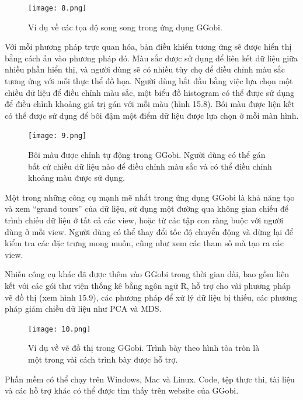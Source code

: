 \documentclass[13pt]{scrartcl} %
\begin{document}
\begin{figure}[!ht] %
    \centering
    \texttt{[image: 8.png]}
    \caption{Ví dụ về các tọa độ song song trong ứng dụng GGobi.}
\end{figure}

Với mỗi phương pháp trực quan hóa, bản điều khiển tương ứng sẽ được hiển thị bằng cách ấn vào phương pháp đó. Màu sắc được sử dụng để liên kết dữ liệu giữa nhiều phần hiển thị, và người dùng sẽ có nhiều tùy chọ để điều chỉnh màu sắc tương ứng với mỗi thực thể đồ họa. Người dùng bắt đầu bằng việc lựa chọn một chiều dữ liệu để điều chỉnh màu sắc, một biểu đồ histogram có thể được sử dụng để điều chỉnh khoảng giá trị gán với mỗi màu (hình 15.8). Bôi màu được liện kết có thể được sử dụng để bôi đậm một điểm dữ liệu được lựa chọn ở mỗi màn hình.

\begin{figure}[!ht] %
    \centering
    \texttt{[image: 9.png]}
    \caption{Bôi màu được chỉnh tự động trong GGobi. Người dùng có thể gán bất cứ chiều dữ liệu nào để điều chỉnh màu sắc và có thể điều chỉnh khoảng màu được sử dụng.}
\end{figure}

Một trong những công cụ mạnh mẽ nhất trong ứng dụng GGobi là khả năng tạo và xem “grand tours” của dữ liệu, sử dụng một đường qua không gian chiếu để trình chiếu dữ liệu ở tất cả các view, hoặc từ các tập con ràng buộc với người dùng ở mỗi view. Người dùng có thể thay đổi tốc độ chuyển động và dừng lại để kiểm tra các đặc trưng mong muốn, cũng như xem các tham số mà tạo ra các view.

Nhiều công cụ khác đã được thêm vào GGobi trong thời gian dài, bao gồm liên kết với các gói thư viện thống kê bằng ngôn ngữ R, hỗ trợ cho vài phương pháp vẽ đồ thị (xem hình 15.9), các phương pháp để xử lý dữ liệu bị thiếu, các phương pháp giảm chiều dữ liệu như PCA và MDS.

\begin{figure}[!ht] %
    \centering
    \texttt{[image: 10.png]}
    \caption{Ví dụ về vẽ đồ thị trong GGobi. Trình bày theo hình tỏa tròn là một trong vài cách trình bày được hỗ trợ.}
\end{figure}

Phần mềm có thể chạy trên Windows, Mac và Linux. Code, tệp thực thi, tài liệu và các hỗ trợ khác có thể được tìm thấy trên website của GGobi.
\end{document}
